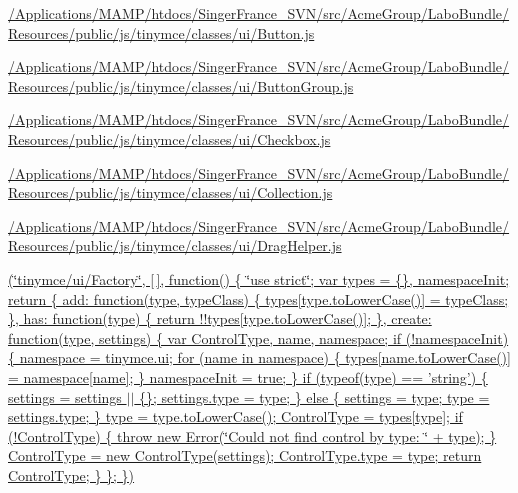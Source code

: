 \begin{DoxyCompactItemize}
\item 
\hyperlink{_2_applications_2_m_a_m_p_2htdocs_2_singer_france__s_v_n_2src_2_acme_group_2_labo_bundle_2_resouf56f6ca625fb2e1a9f8c21608ca6bf55}{/\+Applications/\+M\+A\+M\+P/htdocs/\+Singer\+France\+\_\+\+S\+V\+N/src/\+Acme\+Group/\+Labo\+Bundle/\+Resources/public/js/tinymce/classes/ui/\+Button.\+js}
\item 
\hyperlink{_2_applications_2_m_a_m_p_2htdocs_2_singer_france__s_v_n_2src_2_acme_group_2_labo_bundle_2_resou092db21b076335742a22d241a3c85aaf}{/\+Applications/\+M\+A\+M\+P/htdocs/\+Singer\+France\+\_\+\+S\+V\+N/src/\+Acme\+Group/\+Labo\+Bundle/\+Resources/public/js/tinymce/classes/ui/\+Button\+Group.\+js}
\item 
\hyperlink{_2_applications_2_m_a_m_p_2htdocs_2_singer_france__s_v_n_2src_2_acme_group_2_labo_bundle_2_resoud906ad1c3db3cc42d0dc8760937c4dfa}{/\+Applications/\+M\+A\+M\+P/htdocs/\+Singer\+France\+\_\+\+S\+V\+N/src/\+Acme\+Group/\+Labo\+Bundle/\+Resources/public/js/tinymce/classes/ui/\+Checkbox.\+js}
\item 
\hyperlink{_2_applications_2_m_a_m_p_2htdocs_2_singer_france__s_v_n_2src_2_acme_group_2_labo_bundle_2_resou1a5ca228b88a6949fd83cecc41d11b07}{/\+Applications/\+M\+A\+M\+P/htdocs/\+Singer\+France\+\_\+\+S\+V\+N/src/\+Acme\+Group/\+Labo\+Bundle/\+Resources/public/js/tinymce/classes/ui/\+Collection.\+js}
\item 
\hyperlink{_2_applications_2_m_a_m_p_2htdocs_2_singer_france__s_v_n_2src_2_acme_group_2_labo_bundle_2_resou5c2d190bc6e7e81f7a18c7aabc4e5b1d}{/\+Applications/\+M\+A\+M\+P/htdocs/\+Singer\+France\+\_\+\+S\+V\+N/src/\+Acme\+Group/\+Labo\+Bundle/\+Resources/public/js/tinymce/classes/ui/\+Drag\+Helper.\+js}
\item 
\hyperlink{_2_applications_2_m_a_m_p_2htdocs_2_singer_france__s_v_n_2src_2_acme_group_2_labo_bundle_2_resouc48920ac679ad333e835de9d2e2e1317}{(\char`\"{}tinymce/ui/\+Factory\char`\"{}, \mbox{[}$\,$\mbox{]}, function() \{ \char`\"{}use strict\char`\"{}; var types = \{\}, namespace\+Init; return \{  add\+: function(type, type\+Class) \{ types\mbox{[}type.\+to\+Lower\+Case()\mbox{]} = type\+Class; \},  has\+: function(type) \{ return !!types\mbox{[}type.\+to\+Lower\+Case()\mbox{]}; \},  create\+: function(type, settings) \{ var Control\+Type, name, namespace;  if (!namespace\+Init) \{ namespace = tinymce.\+ui; for (name in namespace) \{ types\mbox{[}name.\+to\+Lower\+Case()\mbox{]} = namespace\mbox{[}name\mbox{]}; \} namespace\+Init = true; \}  if (typeof(type) == 'string') \{ settings = settings $\vert$$\vert$ \{\}; settings.\+type = type; \} else \{ settings = type; type = settings.\+type; \}  type = type.\+to\+Lower\+Case(); Control\+Type = types\mbox{[}type\mbox{]};  if (!\+Control\+Type) \{ throw new Error(\char`\"{}\+Could not find control by type\+: \char`\"{} + type); \}  Control\+Type = new Control\+Type(settings); Control\+Type.\+type = type;  return Control\+Type; \} \}; \})}

\end{DoxyCompactItemize}
